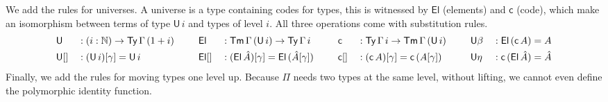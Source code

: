 \documentclass[submission,copyright,creativecommons]{eptcs}
\newcommand{\ra}{\rightarrow}
\newcommand{\Ty}{\mathsf{Ty}}
\newcommand{\Tm}{\mathsf{Tm}}
\newcommand{\N}{\mathbb{N}}
\newcommand{\U}{\mathsf{U}}
\newcommand{\El}{\mathsf{El}}
\newcommand{\cd}{\mathsf{c}}
\newcommand{\Lift}{\mathsf{Lift}}
\newcommand{\mk}{\mathsf{mk}}
\newcommand{\un}{\mathsf{un}}
\begin{document}
We add the rules for universes. A universe is a type containing codes
for types, this is witnessed by $\El$ (elements) and $\cd$ (code),
which make an isomorphism between terms of type $\U\,i$ and types of
level $i$. All three operations come with substitution rules.
\begin{alignat*}{10}
  & \U && : (i:\N)\ra\Ty\,\Gamma\,(1+i) \hspace{1.5em} && \El && : \Tm\,\Gamma\,(\U\,i) \ra \Ty\,\Gamma\,i                          && \cd && : \Ty\,\Gamma\,i\ra\Tm\,\Gamma\,(\U\,i) \hspace{1.5em} && \U\beta && : \El\,(\cd\,A) = A \\
  & \U[] && : (\U\,i)[\gamma] = \U\,i                  && \El[] && : (\El\,\hat{A})[\gamma] = \El\,(\hat{A}[\gamma]) \hspace{1.5em} && \cd[] && : (\cd\,A)[\gamma] = \cd\,(A[\gamma])                && \U\eta && : \cd\,(\El\,\hat{A}) = \hat{A}
\end{alignat*}
Finally, we add the rules for moving types one level up. Because $\Pi$
needs two types at the same level, without lifting, we cannot even
define the polymorphic identity function.
\end{document}
